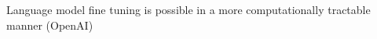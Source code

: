 \documentclass[preview]{standalone}
\begin{document}
Language model fine tuning is possible in a more computationally tractable manner (OpenAI)\\
\end{document}
